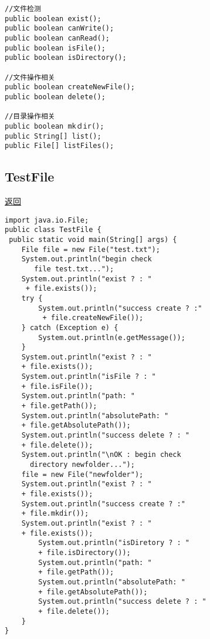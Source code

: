 \documentclass[a4paper,10pt]{article}
\begin{document}
\begin{CJK}{UTF8}{gbsn}
\begin{lstlisting}
//文件检测
public boolean exist();
public boolean canWrite();
public boolean canRead();
public boolean isFile();
public boolean isDirectory();

//文件操作相关
public boolean createNewFile();
public boolean delete();

//目录操作相关
public boolean mkｄir();
public String[] list();
public File[] listFiles();

\end{lstlisting}

\hypertarget{testfile}{}\subsection{TestFile}\hyperlink{rfile}{返回}
\begin{lstlisting}
import java.io.File;
public class TestFile {
 public static void main(String[] args) {
	File file = new File("test.txt");
	System.out.println("begin check 
	   file test.txt...");
	System.out.println("exist ? : "
	 + file.exists());
	try {
		System.out.println("success create ? :"
		 + file.createNewFile());
	} catch (Exception e) {
		System.out.println(e.getMessage());
	} 
	System.out.println("exist ? : " 
	+ file.exists());
	System.out.println("isFile ? : " 
	+ file.isFile());
	System.out.println("path: " 
	+ file.getPath());
	System.out.println("absolutePath: " 
	+ file.getAbsolutePath());
	System.out.println("success delete ? : " 
	+ file.delete());
	System.out.println("\nOK : begin check 
	  directory newfolder...");
	file = new File("newfolder");
	System.out.println("exist ? : " 
	+ file.exists());
	System.out.println("success create ? :" 
	+ file.mkdir());
	System.out.println("exist ? : " 
	+ file.exists());
        System.out.println("isDiretory ? : "
        + file.isDirectory());
        System.out.println("path: " 
        + file.getPath());
        System.out.println("absolutePath: " 
        + file.getAbsolutePath());
        System.out.println("success delete ? : "
        + file.delete());
    }
}

\end{lstlisting}


\end{CJK}
\end{document}
